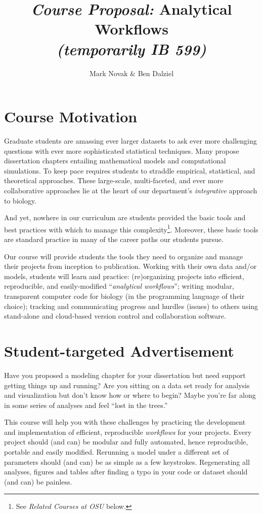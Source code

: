 \documentclass[10pt]{article}
\author{Mark Novak \& Ben Dalziel}
\title{\emph{Course Proposal:}  Analytical Workflows\\\emph{\small{(temporarily} IB 599)}}
\date{}
\begin{document}
\maketitle

\section*{Course Motivation}
Graduate students are amassing ever larger datasets to ask ever more challenging questions with ever more sophisticated  statistical techniques. Many propose dissertation chapters entailing mathematical models and computational simulations. To keep pace requires students to straddle empirical, statistical, and theoretical approaches. These large-scale, multi-faceted, and ever more collaborative approaches lie at the heart of our department's \emph{integrative} approach to biology.

And yet, nowhere in our curriculum are students provided the basic tools and best practices with which to manage this complexity\footnote{See \emph{Related Courses at OSU} below.}. Moreover, these basic tools are standard practice in many of the career paths our students pursue.

Our course will provide students the tools they need to organize and manage their projects from inception to publication.  Working with their own data and/or models, students will learn and practice: (re)organizing projects into efficient, reproducible, and easily-modified ``\emph{analytical workflows}''; writing modular, transparent computer code for biology (in the programming language of their choice); tracking and communicating progress and hurdles (issues) to others using stand-alone and cloud-based version control and collaboration software.

\section*{Student-targeted Advertisement}
Have you proposed a modeling chapter for your dissertation but need support getting things up and running?  Are you sitting on a data set ready for analysis and visualization but don't know how or where to begin?  Maybe you're far along in some series of analyses and feel ``lost in the trees.''

This course will help you with these challenges by practicing the development and implementation of efficient, reproducible \emph{workflows} for your projects.  Every project should (and can) be modular and fully automated, hence reproducible, portable and easily modified.  Rerunning a model under a different set of parameters should (and can) be as simple as a few keystrokes. Regenerating all analyses, figures and tables after finding a typo in your code or dataset should (and can) be painless.
\end{document}
